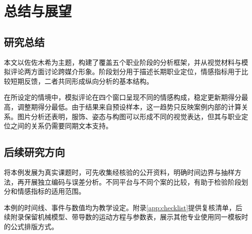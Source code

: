 \chapter{总结与展望}
\section{研究总结}
本文以佐佐木希为主题，构建了覆盖五个职业阶段的分析框架，并从视觉材料与模拟评论两方面讨论跨媒介形象。阶段划分用于描述长期职业定位，情感指标用于比较短期反馈，二者共同形成纵向分析的基本结构。

在所设定的情境中，模拟评论在四个窗口呈现不同的情感构成，稳定更新期得分最高，调整期得分最低。由于结果来自预设样本，这一趋势只反映案例内部的计算关系。图片分析还表明，服饰、姿态与构图可以形成不同的视觉表达，但其与职业定位之间的关系仍需要同期文本支持。

\section{后续研究方向}
将本例发展为真实课题时，可先收集经核验的公开资料，明确时间边界与抽样方法，再开展独立编码与误差分析。不同平台与不同个案的比较，有助于检验阶段划分和情感指标的适用范围。

本例的时间线、事件与数值均为教学设定。附录\ref{app:checklist}提供复核清单，后续附录保留机械模型、带导数的运动方程与参数表，展示其他专业使用同一模板时的公式排版方式。
